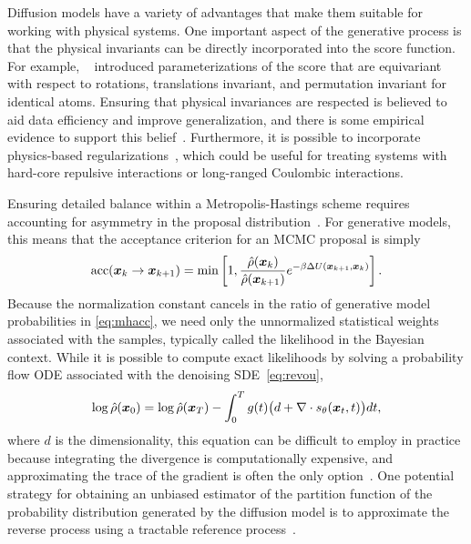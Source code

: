 \documentclass[11pt]{article}
\begin{document}
Diffusion models have a variety of advantages that make them suitable for working with physical systems. 
One important aspect of the generative process is that the physical invariants can be directly incorporated into the score function.
For example, ~\cite{schneuing_structure-based_2022,weiss_guided_2023} introduced parameterizations of the score that are equivariant with respect to rotations, translations invariant, and permutation invariant for identical atoms.
Ensuring that physical invariances are respected is believed to aid data efficiency and improve generalization, and there is some empirical evidence to support this belief~\cite{sannai_improved_2021}.
Furthermore, it is possible to incorporate physics-based regularizations~\cite{zheng_towards_2023}, which could be useful for treating systems with hard-core repulsive interactions or long-ranged Coulombic interactions.

Ensuring detailed balance within a Metropolis-Hastings scheme requires accounting for asymmetry in the proposal distribution~\cite{frenkel_understanding_2002}.
For generative models, this means that the acceptance criterion for an MCMC proposal is simply
\begin{equation}
    \textrm{acc}(\boldsymbol{x}_{k} \to \boldsymbol{x}_{k+1}) = \min \left[ 1, \frac{\hat{\rho}(\boldsymbol{x}_{k})}{\hat{\rho}(\boldsymbol{x}_{k+1})} e^{-\beta \Delta U(\boldsymbol{x}_{k+1},\boldsymbol{x}_k)} \right].
    \label{eq:mhacc}
\end{equation}
Because the normalization constant cancels in the ratio of generative model probabilities in \eqref{eq:mhacc}, we need only the unnormalized statistical weights associated with the samples, typically called the likelihood in the Bayesian context.
While it is possible to compute exact likelihoods by solving a probability flow ODE associated with the denoising SDE~\eqref{eq:revou}, 
\begin{equation}
    \log \hat\rho(\boldsymbol{x}_0) = \log \hat\rho(\boldsymbol{x}_T) - \int_0^T g(t) \bigl( d + \nabla \cdot s_{\theta}(\boldsymbol{x}_t,t) \bigr) dt,
    \label{eq:pfode}
\end{equation}
where $d$ is the dimensionality, this equation can be difficult to employ in practice because integrating the divergence is computationally expensive, and approximating the trace of the gradient is often the only option~\cite{grathwohl_ffjord_2018}.
One potential strategy for obtaining an unbiased estimator of the partition function of the probability distribution generated by the diffusion model is to approximate the reverse process using a tractable reference process~\cite{vargas_denoising_2023}.
\end{document}
